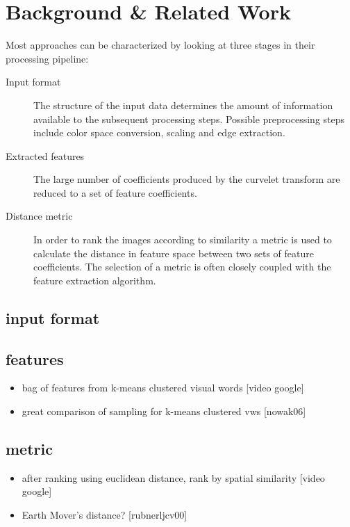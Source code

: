 \chapter{Background \& Related Work}\label{ch:background}
Most approaches can be characterized by looking at three stages in their processing pipeline:

\begin{description}
    \item[Input format] The structure of the input data determines the amount of information available to the subsequent processing steps. Possible preprocessing steps include color space conversion, scaling and edge extraction.
    \item[Extracted features] The large number of coefficients produced by the curvelet transform are reduced to a set of feature coefficients.
    \item[Distance metric] In order to rank the images according to similarity a metric is used to calculate the distance in feature space between two sets of feature coefficients. The selection of a metric is often closely coupled with the feature extraction algorithm.
\end{description}

\section{input format}

\section{features}

\begin{itemize}
    \item bag of features from k-means clustered visual words [video google]
    \item great comparison of sampling for k-means clustered vws [nowak06]
\end{itemize}

\section{metric}

\begin{itemize}
    \item after ranking using euclidean distance, rank by spatial similarity [video google]
    \item Earth Mover's distance? [rubnerljcv00]
\end{itemize}
